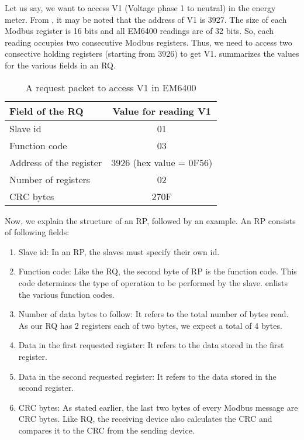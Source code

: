 Let us say, we want to access V1 (Voltage phase 1 to neutral) in the 
energy meter. From , it may be noted that the address of V1 is 
3927. The size of each Modbus register is 16 bits and all EM6400 readings
are of 32 bits. So, each reading occupies two consecutive Modbus
registers. Thus, we need to access two consective holding registers 
(starting from 3926) to get V1.  summarizes the 
values for the various fields in an RQ. 
\begin{table}
  \centering
  \caption{A request packet to access V1 in EM6400}
  \label{tab:params-rq}
  \begin{tabular}{lc}\hline
    Field of the RQ         & Value for reading V1    \\ \hline 
    Slave id                & 01                      \\
    Function code           & 03                      \\ 
    Address of the register & 3926 (hex value = 0F56) \\
    Number of registers     & 02                      \\
    CRC bytes               & 270F                    \\
    \hline 
  \end{tabular}
\end{table}
Now, we explain the structure of an RP, followed by an example. 
An RP consists of following fields: 
\begin{enumerate}
  \item Slave id: In an RP, the slaves must specify their own id.
  \item Function code: Like the RQ, the second byte of RP is the function code.
        This code determines the type of operation to be 
        performed by the slave.  enlists the various 
        function codes. 
  \item Number of data bytes to follow: It refers to the total number of bytes
        read. As our RQ has 2 registers each of two bytes, we expect a total of 4 bytes. 
  \item Data in the first requested register: It refers to the data stored
        in the first register. 
  \item Data in the second requested register: It refers to the data stored
        in the second register. 
  \item CRC bytes: As stated earlier, the last two bytes of every Modbus message are CRC
        bytes. Like RQ, the receiving device also calculates the CRC and compares it to the 
        CRC from the sending device. 
\end{enumerate}
